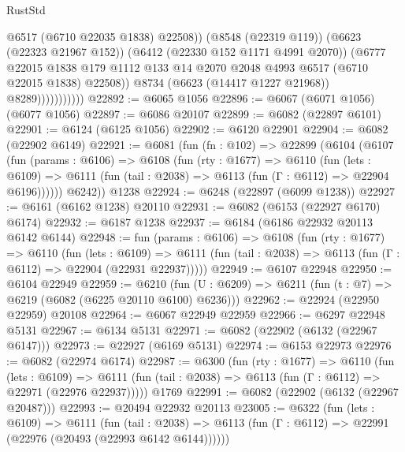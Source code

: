 \begin{lexlean}{RustStd}
\begin{coremodule}
                                @6517
                                (@6710 @22035 @1838)
                                @22508))
                            (@8548 (@22319 @119))
                            (@6623 (@22323 @21967 @152))
                            (@6412 (@22330 @152 @1171 @4991 @2070))
                            (@6777
                              @22015
                              @1838
                              @179
                              @1112
                              @133
                              @14
                              @2070
                              @2048
                              @4993
                              @6517
                              (@6710 @22015 @1838)
                              @22508))
                          @8734
                          (@6623 (@14417 @1227 @21968))
                          @8289)))))))))))
@22892 := @6065 @1056
@22896 := @6067 (@6071 @1056) (@6077 @1056)
@22897 := @6086 @20107
@22899 := @6082 (@22897 @6101)
@22901 := @6124 (@6125 @1056)
@22902 := @6120 @22901
@22904 := @6082 (@22902 @6149)
@22921 := @6081
    (fun (fn : @102) =>
    @22899
      (@6104
        (@6107
          (fun (params : @6106) =>
          @6108
            (fun (rty : @1677) =>
            @6110
              (fun (lets : @6109) =>
              @6111 (fun (tail : @2038) => @6113 (fun (Γ : @6112) => @22904 @6196))))))
        @6242))
    @1238
@22924 := @6248 (@22897 (@6099 @1238))
@22927 := @6161 (@6162 @1238) @20110
@22931 := @6082 (@6153 (@22927 @6170) @6174)
@22932 := @6187 @1238
@22937 := @6184 (@6186 @22932 @20113 @6142 @6144)
@22948 := fun (params : @6106) =>
  @6108
    (fun (rty : @1677) =>
    @6110
      (fun (lets : @6109) =>
      @6111 (fun (tail : @2038) => @6113 (fun (Γ : @6112) => @22904 (@22931 @22937)))))
@22949 := @6107 @22948
@22950 := @6104 @22949
@22959 := @6210
    (fun (U : @6209) => @6211 (fun (t : @7) => @6219 (@6082 (@6225 @20110 @6100) @6236)))
@22962 := @22924 (@22950 @22959) @20108
@22964 := @6067 @22949 @22959
@22966 := @6297 @22948 @5131
@22967 := @6134 @5131
@22971 := @6082 (@22902 (@6132 (@22967 @6147)))
@22973 := @22927 (@6169 @5131)
@22974 := @6153 @22973
@22976 := @6082 (@22974 @6174)
@22987 := @6300
    (fun (rty : @1677) =>
    @6110
      (fun (lets : @6109) =>
      @6111 (fun (tail : @2038) => @6113 (fun (Γ : @6112) => @22971 (@22976 @22937)))))
    @1769
@22991 := @6082 (@22902 (@6132 (@22967 @20487)))
@22993 := @20494 @22932 @20113
@23005 := @6322
    (fun (lets : @6109) =>
    @6111
      (fun (tail : @2038) =>
      @6113 (fun (Γ : @6112) => @22991 (@22976 (@20493 (@22993 @6142 @6144))))))

\end{coremodule}
\end{lexlean}
